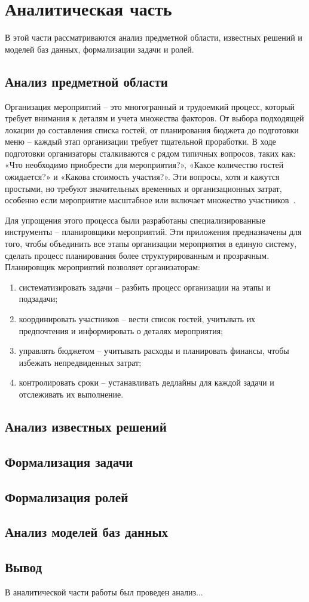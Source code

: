 \chapter{Аналитическая часть}

В этой части рассматриваются анализ предметной области, известных решений и моделей баз данных, формализации задачи и ролей.

\section{Анализ предметной области}

Организация мероприятий -- это многогранный и трудоемкий процесс, который требует внимания к деталям и учета множества факторов. От выбора подходящей локации до составления списка гостей, от планирования бюджета до подготовки меню -- каждый этап организации требует тщательной проработки. В ходе подготовки организаторы сталкиваются с рядом типичных вопросов, таких как: «Что необходимо приобрести для мероприятия?», «Какое количество гостей ожидается?» и «Какова стоимость участия?». Эти вопросы, хотя и кажутся простыми, но требуют значительных временных и организационных затрат, особенно если мероприятие масштабное или включает множество участников~\cite{lit1}.

Для упрощения этого процесса были разработаны специализированные инструменты -- планировщики мероприятий. Эти приложения предназначены для того, чтобы объединить все этапы организации мероприятия в единую систему, сделать процесс планирования более структурированным и прозрачным. Планировщик мероприятий позволяет организаторам:
\begin{enumerate}
	\item систематизировать задачи -- разбить процесс организации на этапы и подзадачи;
	\item координировать участников -- вести список гостей, учитывать их предпочтения и информировать о деталях мероприятия;
	\item управлять бюджетом -- учитывать расходы и планировать финансы, чтобы избежать непредвиденных затрат;
	\item контролировать сроки -- устанавливать дедлайны для каждой задачи и отслеживать их выполнение.
\end{enumerate}


\section{Анализ известных решений}

\section{Формализация задачи}

\section{Формализация ролей}

\section{Анализ моделей баз данных}

\section{Вывод}

В аналитической части работы был проведен анализ...

\clearpage
